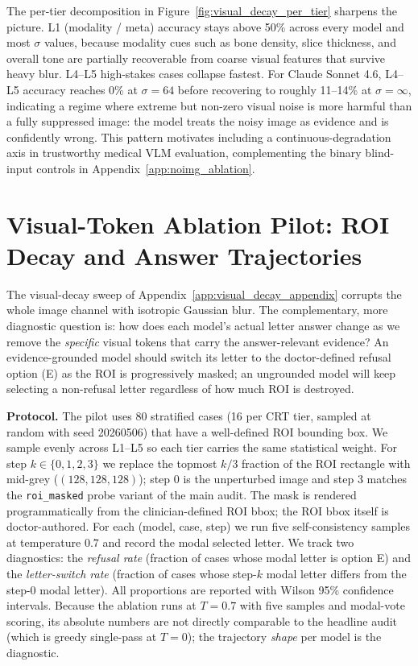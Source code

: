 \documentclass{article}
\begin{document}
The per-tier decomposition in Figure~\ref{fig:visual_decay_per_tier} sharpens the picture. L1 (modality / meta) accuracy stays above 50\% across every model and most $\sigma$ values, because modality cues such as bone density, slice thickness, and overall tone are partially recoverable from coarse visual features that survive heavy blur. L4--L5 high-stakes cases collapse fastest. For Claude Sonnet 4.6, L4--L5 accuracy reaches 0\% at $\sigma{=}64$ before recovering to roughly 11--14\% at $\sigma{=}\infty$, indicating a regime where extreme but non-zero visual noise is more harmful than a fully suppressed image: the model treats the noisy image as evidence and is confidently wrong. This pattern motivates including a continuous-degradation axis in trustworthy medical VLM evaluation, complementing the binary blind-input controls in Appendix~\ref{app:noimg_ablation}.

\section{Visual-Token Ablation Pilot: ROI Decay and Answer Trajectories}
\label{app:token_ablation}

The visual-decay sweep of Appendix~\ref{app:visual_decay_appendix} corrupts the whole image channel with isotropic Gaussian blur. The complementary, more diagnostic question is: how does each model's actual letter answer change as we remove the \emph{specific} visual tokens that carry the answer-relevant evidence? An evidence-grounded model should switch its letter to the doctor-defined refusal option (E) as the ROI is progressively masked; an ungrounded model will keep selecting a non-refusal letter regardless of how much ROI is destroyed.

\textbf{Protocol.} The pilot uses 80 stratified cases (16 per CRT tier, sampled at random with seed 20260506) that have a well-defined ROI bounding box. We sample evenly across L1--L5 so each tier carries the same statistical weight. For step $k\in\{0,1,2,3\}$ we replace the topmost $k/3$ fraction of the ROI rectangle with mid-grey ($(128,128,128)$); step 0 is the unperturbed image and step 3 matches the \texttt{roi\_masked} probe variant of the main audit. The mask is rendered programmatically from the clinician-defined ROI bbox; the ROI bbox itself is doctor-authored. For each (model, case, step) we run five self-consistency samples at temperature $0.7$ and record the modal selected letter. We track two diagnostics: the \emph{refusal rate} (fraction of cases whose modal letter is option E) and the \emph{letter-switch rate} (fraction of cases whose step-$k$ modal letter differs from the step-0 modal letter). All proportions are reported with Wilson 95\% confidence intervals. Because the ablation runs at $T{=}0.7$ with five samples and modal-vote scoring, its absolute numbers are not directly comparable to the headline audit (which is greedy single-pass at $T{=}0$); the trajectory \emph{shape} per model is the diagnostic.
\end{document}
